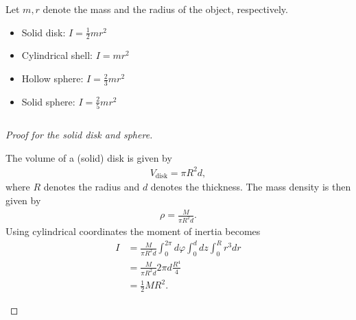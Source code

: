     \begin{example}
        Let $m,r$ denote the mass and the radius of the object, respectively.
        \begin{itemize}
            \item Solid disk: $I = \frac{1}{2}mr^2$
            \item Cylindrical shell: $I = mr^2$
            \item Hollow sphere: $I = \frac{2}{3}mr^2$
            \item Solid sphere: $I = \frac{2}{5}mr^2$
        \end{itemize}$ $ %
        \begin{proof}[Proof for the solid disk and sphere]
            \begin{mdframed}[roundcorner=10pt, linecolor=blue, linewidth=1pt]
                The volume of a (solid) disk is given by
                \begin{gather}
                    V_\mathrm{disk} = \pi R^2d,
                \end{gather}
                where $R$ denotes the radius and $d$ denotes the thickness. The mass density is then given by
                \begin{gather}
                    \rho = \frac{M}{\pi R^2d}.
                \end{gather}
                Using cylindrical coordinates the moment of inertia becomes
                \begin{align}
                    I &= \frac{M}{\pi R^2d}\int_0^{2\pi}d\varphi\int_0^ddz\int_0^Rr^3dr\nonumber\\
                    &= \frac{M}{\pi R^2d}2\pi d\frac{R^4}{4}\nonumber\\
                    &= \frac{1}{2}MR^2.
                \end{align}


\end{mdframed}
\end{proof}
\end{example}
